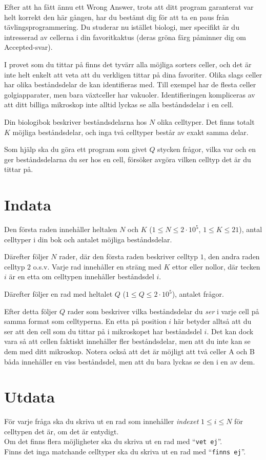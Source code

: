 Efter att ha fått ännu ett Wrong Answer, trots att ditt program garanterat var helt korrekt den här gången, har du bestämt dig för att ta en paus från tävlingsprogrammering.
Du studerar nu istället biologi, mer specifikt är du intresserad av cellerna i din favoritkaktus (deras gröna färg påminner dig om Accepted-svar).

I provet som du tittar på finns det tyvärr alla möjliga sorters celler, och det är inte helt enkelt att veta att du verkligen tittar på dina favoriter.
Olika slags celler har olika beståndsdelar de kan identifieras med.
Till exempel har de flesta celler golgiapparater, men bara växtceller har vakuoler.
Identifieringen kompliceras av att ditt billiga mikroskop inte alltid lyckas se alla beståndsdelar i en cell.

Din biologibok beskriver beståndsdelarna hos $N$ olika celltyper.
Det finns totalt $K$ möjliga beståndsdelar, och inga två celltyper består av exakt samma delar.

Som hjälp ska du göra ett program som givet $Q$ stycken frågor, vilka var och en ger beståndsdelarna du ser hos en cell, försöker avgöra vilken celltyp det är du tittar på.

\section*{Indata}
Den första raden innehåller heltalen $N$ och $K$ ($1 \leq N \leq 2 \cdot 10^5$, $1 \leq K \leq 21$), antal celltyper i din bok och antalet möjliga beståndsdelar. 

Därefter följer $N$ rader, där den första raden beskriver celltyp $1$, den andra raden celltyp $2$ o.s.v.
Varje rad innehåller en sträng med $K$ ettor eller nollor, där tecken $i$ är en etta om celltypen innehåller beståndsdel $i$. 

Därefter följer en rad med heltalet $Q$ ($1 \leq Q \leq 2\cdot 10^5$), antalet frågor. 

Efter detta följer $Q$ rader som beskriver vilka beståndsdelar du \textit{ser} i varje cell på samma format som celltyperna.
En etta på position $i$ här betyder alltså att du ser att den cell som du tittar på i mikroskopet har beståndsdel $i$.
Det kan dock vara så att cellen faktiskt innehåller fler beståndsdelar, men att du inte kan se dem med ditt mikroskop.
Notera också att det är möjligt att två celler A och B båda innehåller en viss beståndsdel, men att du
bara lyckas se den i en av dem.

\section*{Utdata}
För varje fråga ska du skriva ut en rad som innehåller \textit{indexet} $1 \leq i \leq N$ för celltypen det är, om det är entydigt. \\
Om det finns flera möjligheter ska du skriva ut en rad med ``\texttt{vet ej}''. \\
Finns det inga matchande celltyper ska du skriva ut en rad med ``\texttt{finns ej}''.

